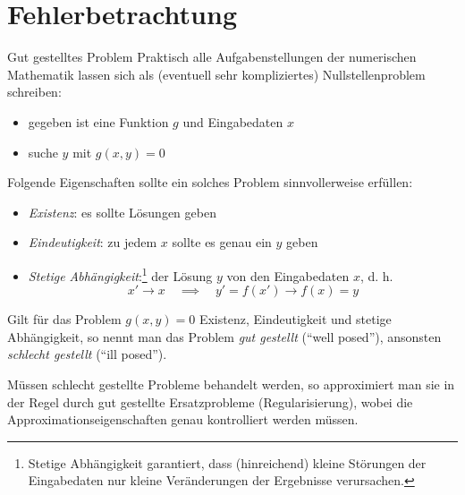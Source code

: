 \section{Fehlerbetrachtung}

\begin{defi}{Gut gestelltes Problem}
    Praktisch alle Aufgabenstellungen der numerischen Mathematik lassen sich als (eventuell sehr kompliziertes) Nullstellenproblem schreiben:
    \begin{itemize}
        \item gegeben ist eine Funktion $g$ und Eingabedaten $x$
        \item suche $y$ mit $g(x, y) = 0$
    \end{itemize}

    Folgende Eigenschaften sollte ein solches Problem sinnvollerweise erfüllen:
    \begin{itemize}
        \item \emph{Existenz}: es sollte Lösungen geben
        \item \emph{Eindeutigkeit}: zu jedem $x$ sollte es genau ein $y$ geben
        \item \emph{Stetige Abhängigkeit}:\footnote{Stetige Abhängigkeit garantiert, dass (hinreichend) kleine Störungen der Eingabedaten nur kleine Veränderungen der Ergebnisse verursachen.} der Lösung $y$ von den Eingabedaten $x$, d. h.
              \[
                  x' \to x \quad \implies \quad y' = f(x') \to f(x) = y
              \]
    \end{itemize}

    Gilt für das Problem $g(x, y) = 0$ Existenz, Eindeutigkeit und stetige Abhängigkeit, so nennt man das Problem \emph{gut gestellt} (\enquote{well posed}), ansonsten \emph{schlecht gestellt} (\enquote{ill posed}).

    Müssen schlecht gestellte Probleme behandelt werden, so approximiert man sie in der Regel durch gut gestellte Ersatzprobleme (Regularisierung), wobei die Approximationseigenschaften genau kontrolliert werden müssen.
\end{defi}

